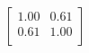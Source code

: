 \begin{equation}
\left[
\begin{array}{cc}
1.00 & 0.61 \\
0.61 & 1.00 \\
\end{array}
\right]
\end{equation}
